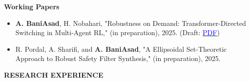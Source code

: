 \documentclass[12pt]{article}
\begin{document}
\noindent
{\bfseries Working Papers}

\begin{itemize} \itemsep -1pt %
	\item \textbf{A. BaniAsad}, H. Nobahari, "Robustness on Demand: Transformer-Directed Switching in Multi-Agent RL," (in preparation), 2025. (Draft: \href{https://github.com/alibaniasad1999/master-thesis/blob/main/Paper/ZS-MARL.pdf}{\textcolor{blue}{PDF}})
	\item R. Pordal, A. Sharifi, and \textbf{A. BaniAsad}, "A Ellipsoidal Set-Theoretic Approach to Robust Safety Filter Synthesis," (in preparation), 2025.
\end{itemize}



 \newpage
\vspace{-4pt}
\begin{center}
	{\noindent \bfseries RESEARCH EXPERIENCE}
\end{center}

\vspace{8pt} %

\noindent
\end{document}
